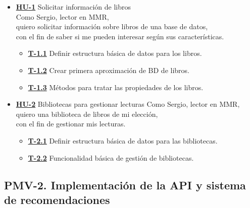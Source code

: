 \begin{itemize}
    \item \href{https://github.com/Anglepi/My-Many-Reads/issues/29}{\textbf{HU-1}} Solicitar información de libros \\
    Como Sergio, lector en MMR, \\
    quiero solicitar información sobre libros de una base de datos, \\
    con el fin de saber si me pueden interesar según sus características.
    \begin{itemize}
        \item \href{https://github.com/Anglepi/My-Many-Reads/issues/31}{\textbf{T-1.1}} Definir estructura básica de datos para los libros.
        \item \href{https://github.com/Anglepi/My-Many-Reads/issues/32}{\textbf{T-1.2}} Crear primera aproximación de BD de libros.
        \item \href{https://github.com/Anglepi/My-Many-Reads/issues/33}{\textbf{T-1.3}} Métodos para tratar las propiedades de los libros.
    \end{itemize}
    \item \href{https://github.com/Anglepi/My-Many-Reads/issues/30}{\textbf{HU-2}} Bibliotecas para gestionar lecturas
    Como Sergio, lector en MMR, \\
    quiero una biblioteca de libros de mi elección, \\
    con el fin de gestionar mis lecturas.
    \begin{itemize}
        \item \href{https://github.com/Anglepi/My-Many-Reads/issues/34}{\textbf{T-2.1}} Definir estructura básica de datos para las bibliotecas.
        \item \href{https://github.com/Anglepi/My-Many-Reads/issues/35}{\textbf{T-2.2}} Funcionalidad básica de gestión de bibliotecas.
    \end{itemize}
\end{itemize}

\subsection{PMV-2. Implementación de la API y sistema de recomendaciones}

